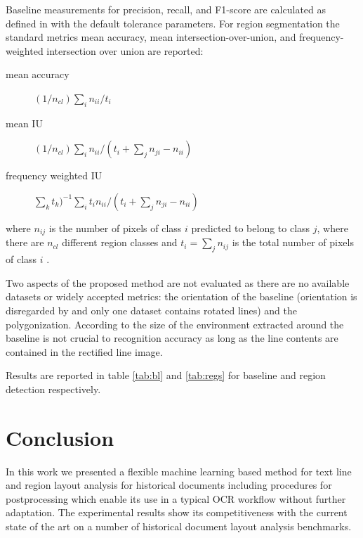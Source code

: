 Baseline measurements for precision, recall, and F1-score are calculated as
defined in \cite{gruning2018read} with the default tolerance parameters. For
region segmentation the standard metrics mean accuracy, mean
intersection-over-union, and frequency-weighted intersection over union are
reported:

\begin{description}
	\item[mean accuracy] $(1/n_{cl}) \sum_i n_{ii}/t_i$
	\item[mean IU] $(1/n_{cl})\sum_i n_{ii} / (t_i + \sum_j n_{ji} - n_{ii})$
	\item[frequency weighted IU] $\sum_k t_k)^{-1}\sum_it_in_{ii}/(t_i + \sum_j n_{ji} - n_{ii})$
\end{description}

where $n_{ij}$ is the number of pixels of class $i$ predicted to belong to
class $j$, where there are $n_{cl}$ different region classes and $t_i = \sum_j
n_{ij}$ is the total number of pixels of class $i$ \cite{long2015fully}.

Two aspects of the proposed method are not evaluated as there are no available
datasets or widely accepted metrics: the orientation of the baseline
(orientation is disregarded by \cite{gruning2018read} and only one dataset
contains rotated lines) and the polygonization. According to
\cite{romero2015influence} the size of the environment extracted around the
baseline is not crucial to recognition accuracy as long as the line contents
are contained in the rectified line image.

Results are reported in table \ref{tab:bl} and \ref{tab:regs} for baseline
and region detection respectively.

\section{Conclusion}

In this work we presented a flexible machine learning based method for text
line and region layout analysis for historical documents including procedures
for postprocessing which enable its use in a typical OCR workflow without
further adaptation. The experimental results show its competitiveness with the
current state of the art on a number of historical document layout analysis
benchmarks.
